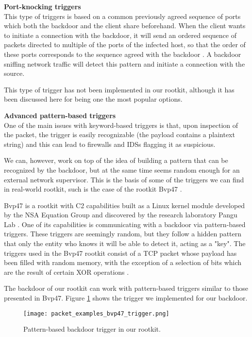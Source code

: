 \textbf{Port-knocking triggers}\\
This type of triggers is based on a common previously agreed sequence of ports which both the backdoor and the client share beforehand. When the client wants to initiate a connection with the backdoor, it will send an ordered sequence of packets directed to multiple of the ports of the infected host, so that the order of these ports corresponds to the sequence agreed with the backdoor \cite{port_knocking}. A backdoor sniffing network traffic will detect this pattern and initiate a connection with the source.

This type of trigger has not been implemented in our rootkit, although it has been discussed here for being one the most popular options.

\textbf{Advanced pattern-based triggers}\\
One of the main issues with keyword-based triggers is that, upon inspection of the packet, the trigger is easily recognizable (the payload contains a plaintext string) and this can lead to firewalls and IDSs flagging it as suspicious. 

We can, however, work on top of the idea of building a pattern that can be recognized by the backdoor, but at the same time seems random enough for an external network supervisor. This is the basis of some of the triggers we can find in real-world rootkit, such is the case of the rootkit Bvp47 \cite{bvp47_report}. 

Bvp47 is a rootkit with C2 capabilities built as a Linux kernel module developed by the NSA Equation Group and discovered by the research laboratory Pangu Lab \cite{pangu_lab}. One of its capabilities is communicating with a backdoor via pattern-based triggers. These triggers are seemingly random, but they follow a hidden pattern that only the entity who knows it will be able to detect it, acting as a "key". The triggers used in the Bvp47 rootkit consist of a TCP packet whose payload has been filled with random memory, with the exception of a selection of bits which are the result of certain XOR operations \cite{bvp47_report_p49}.

The backdoor of our rootkit can work with pattern-based triggers similar to those presented in Bvp47. Figure \ref{fig:bvp47_trigger} shows the trigger we implemented for our backdoor.

\begin{figure}[htbp]
	\centering
	\texttt{[image: packet\_examples\_bvp47\_trigger.png]}
	\caption{Pattern-based backdoor trigger in our rootkit.}
	\label{fig:bvp47_trigger}
\end{figure}

